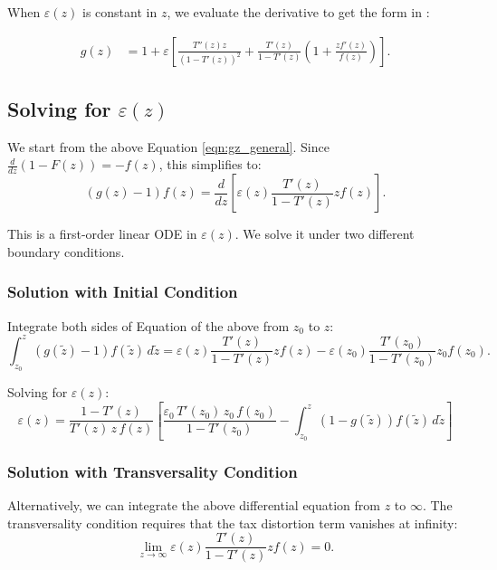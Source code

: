 \documentclass[12pt]{article}
\begin{document}
When $\varepsilon(z)$ is constant in $z$, we evaluate the derivative to get the form in \citet{JJZ2017}:

\begin{align*}
g(z) &= 1 + \varepsilon \left[\frac{T''(z) z}{(1-T'(z))^2} + \frac{T'(z)}{1-T'(z)}\left(1 + \frac{z f'(z)}{f(z)}\right)\right].
\end{align*}

\subsection{Solving for \texorpdfstring{$\varepsilon(z)$}{epsilon(z)}}

We start from the above Equation \ref{eqn:gz_general}. Since $\frac{d}{dz}(1-F(z)) = -f(z)$, this simplifies to:
\begin{equation*}
(g(z) - 1) f(z) = \frac{d}{dz}\left[\varepsilon(z) \frac{T'(z)}{1-T'(z)} z f(z)\right].
\end{equation*}

This is a first-order linear ODE in $\varepsilon(z)$. We solve it under two different boundary conditions.

\subsubsection{Solution with Initial Condition}

Integrate both sides of Equation of the above from $z_0$ to $z$:
$$\int_{z_0}^{z} (g(\tilde{z}) - 1) f(\tilde{z}) \, d\tilde{z} = \varepsilon(z) \frac{T'(z)}{1-T'(z)} z f(z) - \varepsilon(z_0) \frac{T'(z_0)}{1-T'(z_0)} z_0 f(z_0).$$

Solving for $\varepsilon(z)$:
\begin{equation*}
\varepsilon(z) = \frac{1-T'(z)}{T'(z) \, z \, f(z)}\left[\frac{\varepsilon_0 \, T'(z_0) \, z_0 \, f(z_0)}{1-T'(z_0)} - \int_{z_0}^{z} (1-g(\tilde{z})) f(\tilde{z}) \, d\tilde{z}\right]
\end{equation*}

\subsubsection{Solution with Transversality Condition}

Alternatively, we can integrate the above differential equation from $z$ to $\infty$. The transversality condition requires that the tax distortion term vanishes at infinity:
$$\lim_{z \to \infty} \varepsilon(z) \frac{T'(z)}{1-T'(z)} z f(z) = 0.$$
\end{document}
